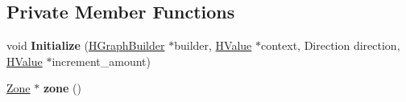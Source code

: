 \subsection*{Private Member Functions}
\begin{DoxyCompactItemize}
\item 
void {\bfseries Initialize} (\hyperlink{classv8_1_1internal_1_1_h_graph_builder}{H\+Graph\+Builder} $\ast$builder, \hyperlink{classv8_1_1internal_1_1_h_value}{H\+Value} $\ast$context, Direction direction, \hyperlink{classv8_1_1internal_1_1_h_value}{H\+Value} $\ast$increment\+\_\+amount)\hypertarget{classv8_1_1internal_1_1_h_graph_builder_1_1_loop_builder_addfe76c277875e8cd6ac57b33b3efb4c}{}\label{classv8_1_1internal_1_1_h_graph_builder_1_1_loop_builder_addfe76c277875e8cd6ac57b33b3efb4c}

\item 
\hyperlink{classv8_1_1internal_1_1_zone}{Zone} $\ast$ {\bfseries zone} ()\hypertarget{classv8_1_1internal_1_1_h_graph_builder_1_1_loop_builder_a1343f0853c4759855a8b25af8dc525a5}{}\label{classv8_1_1internal_1_1_h_graph_builder_1_1_loop_builder_a1343f0853c4759855a8b25af8dc525a5}

\end{DoxyCompactItemize}
